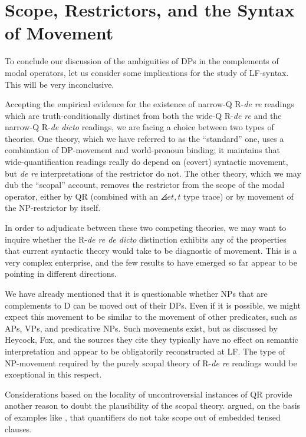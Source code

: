 \section{Scope, Restrictors, and the Syntax of Movement}

To conclude our discussion of the ambiguities of DPs in the complements of modal operators, let us consider some implications for the study of LF-syntax. This will be very inconclusive.

Accepting the empirical evidence for the existence of narrow-Q R-\emph{de re} readings which are truth-conditionally distinct from both the wide-Q R-\emph{de re} and the narrow-Q R-\emph{de dicto} readings, we are facing a choice between two types of theories. One theory, which we have referred to as the ``standard'' one, uses a combination of DP-movement and world-pronoun binding; it maintains that wide-quantification readings really do depend on (covert) syntactic movement, but \emph{de re} interpretations of the restrictor do not. The other theory, which we may dub the ``scopal'' account, removes the restrictor from the scope of the modal operator, either by QR (combined with an $\angles{et,t}$ type trace) or by movement of the NP-restrictor by itself.

In order to adjudicate between these two competing theories, we may want to inquire whether the R-\emph{de re \dash de dicto} distinction exhibits any of the properties that current syntactic theory would take to be diagnostic of movement. This is a very complex enterprise, and the few results to have emerged so far appear to be pointing in different directions.

We have already mentioned that it is questionable whether NPs that are complements to D can be moved out of their DPs. Even if it is possible, we might expect this movement to be similar to the movement of other predicates, such as APs, VPs, and predicative NPs. Such movements exist, but \dash as discussed by Heycock, Fox, and the sources they cite \dash they typically have no effect on semantic interpretation and appear to be obligatorily reconstructed at LF. The type of NP-movement required by the purely scopal theory of R-\emph{de re} readings would be exceptional in this respect.

Considerations based on the locality of uncontroversial instances of QR provide another reason to doubt the plausibility of the scopal theory. \citet{may:diss} argued, on the basis of examples like \Next, that quantifiers do not take scope out of embedded tensed clauses.

